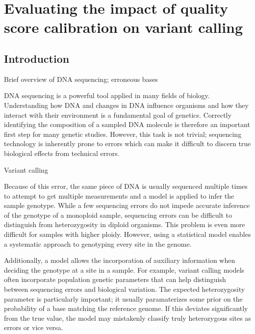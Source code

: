 \documentclass{report}
\begin{document}
\linenumbers

\chapter{Evaluating the impact of quality score calibration on variant calling}

\section{Introduction}
\begin{outline}
\item Brief overview of DNA sequencing; erroneous bases
	\begin{outline}
	\item DNA sequencing is a powerful tool applied in many fields of biology. Understanding how DNA and changes in DNA influence organisms and how they interact with their environment is a fundamental goal of genetics. Correctly identifying the composition of a sampled DNA molecule is therefore an important first step for many genetic studies. However, this task is not trivial; sequencing technology is inherently prone to errors which can make it difficult to discern true biological effects from technical errors. 
	\end{outline}
\item Variant calling
	\begin{outline}
	\item Because of this error, the same piece of DNA is usually sequenced multiple times to attempt to get multiple measurements and a model is applied to infer the sample genotype. While a few sequencing errors do not impede accurate inference of the genotype of a monoploid sample, sequencing errors can be difficult to distinguish from heterozygosity in diploid organisms. This problem is even more difficult for samples with higher ploidy. However, using a statistical model enables a systematic approach to genotyping every site in the genome.
	\item Additionally, a model allows the incorporation of auxiliary information when deciding the genotype at a site in a sample. For example, variant calling models often incorporate population genetic parameters that can help distinguish between sequencing errors and biological variation. The expected heterozygosity parameter \theta is particularly important; it usually paramaterizes some prior on the probability of a base matching the reference genome. If this deviates significantly from the true value, the model may mistakenly classify truly heterozygous sites as errors or vice versa.

\end{outline}
\end{outline}
\end{document}

